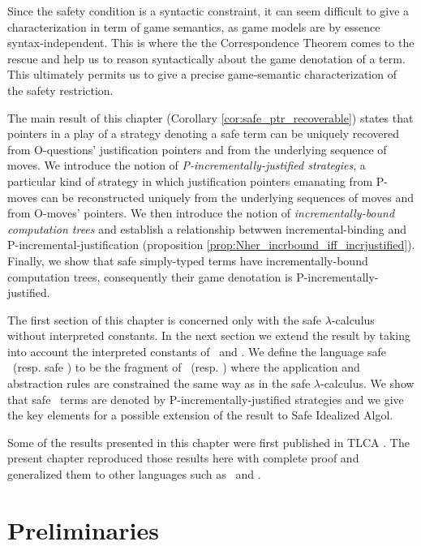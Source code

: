 Since the safety condition is a syntactic constraint, it can seem
difficult to give a characterization in term of game
semantics, as game models are by essence syntax-independent. This is where the the Correspondence Theorem comes to the rescue and help us to reason syntactically about the game denotation of a term. This ultimately permits us to give a precise game-semantic characterization of the safety restriction.

The main result of this chapter (Corollary
\ref{cor:safe_ptr_recoverable}) states that pointers in a play of
a strategy denoting  a safe term can be uniquely recovered
from O-questions' justification pointers and from the underlying sequence of
moves. We introduce the
notion of \emph{P-incrementally-justified strategies}, a particular kind of strategy in which justification pointers emanating from P-moves can be
reconstructed uniquely from the underlying sequences of moves and
from O-moves' pointers. We then introduce the notion of
\emph{incrementally-bound computation trees} and establish a relationship betwwen
incremental-binding and P-incremental-justification (proposition \ref{prop:Nher_incrbound_iff_incrjustified}). Finally, we show that safe simply-typed terms have incrementally\--bound computation trees, consequently their game denotation is P-incrementally-justified.


The first section of this chapter is concerned only with the safe $\lambda$-calculus without interpreted constants. In the next
section we extend the result by taking into account the interpreted
constants of \pcf\ and \ialgol. We define the language safe \ialgol\
(resp. safe \pcf) to be the fragment of \ialgol\ (resp. \pcf) where
the application and abstraction rules are constrained the same way
as in the safe $\lambda$-calculus. We show that safe \pcf\ terms are
denoted by P-incrementally-justified strategies and we give the key
elements for a possible extension of the result to Safe Idealized
Algol.

Some of the results presented in this chapter were first published in TLCA \cite{blumong:safelambdacalculus}. The present chapter reproduced those results here with complete proof and generalized them to other languages such as \pcf\ and \ialgol.

\section{Preliminaries}

